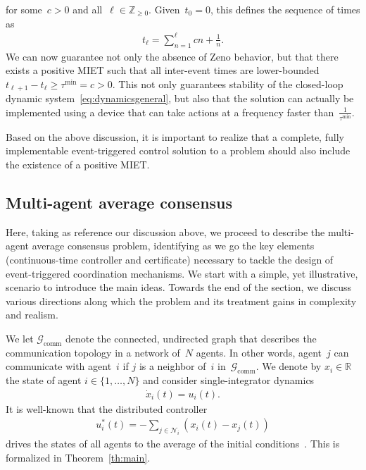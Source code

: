 \documentclass{autart}
\newcommand{\real}{{\mathbb{R}}}
\newcommand{\integernonnegative}{\mathbb{Z}_{\ge 0}}
\newcommand{\GG}{{\mathcal{G}}}
\newcommand{\NN}{{\mathcal{N}}}
\newcommand{\until}[1]{\{1,\dots, #1\}}
\newcommand{\commgraph}{\GG_\text{comm}}
\begin{document}
{\begin{description}
  for some~$c > 0$ and all~$\ell \in \integernonnegative$. Given~$t_0
  = 0$, this defines the sequence of times as
  \begin{align*}
    t_\ell = \sum_{n=1}^\ell cn + \frac{1}{n}.
  \end{align*}
  We can now guarantee not only the absence of Zeno behavior, but that
  there exists a positive MIET such that all inter-event times are
  lower-bounded $t_{\ell+1} - t_{\ell} \geq \tau^\text{min} = c >
  0$. This not only guarantees stability of the closed-loop dynamic
  system~\eqref{eq:dynamicsgeneral}, but also that the solution can
  actually be implemented using a device that can take actions at a
  frequency faster than~$\frac{1}{\tau^\text{min}}$.
\end{description}

Based on the above discussion, it is important to realize that a
complete, fully implementable event-triggered control solution to a
problem should also include the existence of a positive
MIET.

}

\subsection{Multi-agent average consensus}

Here, taking as reference our discussion above, we proceed to describe
the multi-agent average consensus problem, identifying as we go the
key elements (continuous-time controller and certificate) necessary to
tackle the design of event-triggered coordination mechanisms.  We
start with a simple, yet illustrative, scenario to introduce the main
ideas. Towards the end of the section, we discuss various directions
along which the problem and its treatment gains in complexity and
realism.  

We let $\commgraph$ denote the connected, undirected graph
that describes the communication topology in a network of~$N$
agents. In other words, agent~$j$ can communicate with agent~$i$ if
$j$ is a neighbor of~$i$ in~$\commgraph$.  We denote by
$x_i \in \real$ the state of agent $i \in \until{N}$ and consider
single-integrator dynamics
\begin{align}\label{eq:dynamics}
  \dot{x}_i(t) = u_i(t).
\end{align}
It is well-known that the distributed controller
\begin{align}\label{eq:ideal}
  u_i^*(t) = -\sum_{j \in \NN_i} \left( x_i(t) - x_j(t) \right)
\end{align}
drives the states of all agents to the average of the initial
conditions~\citep{ROS-RMM:03c,ROS-JAF-RMM:07}. This is formalized in
Theorem~\ref{th:main}.
\end{document}
